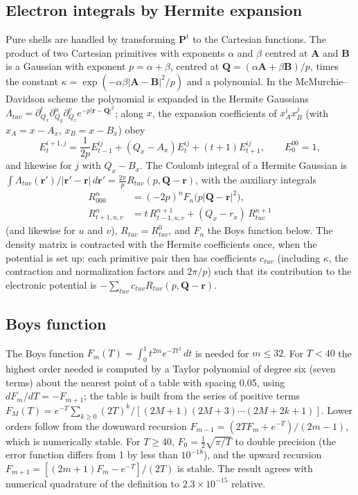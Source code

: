 \documentclass[11pt,a4paper]{article}
\begin{document}
\subsection{Electron integrals by Hermite expansion}
Pure shells are handled by transforming $\mathbf P^{\mathrm t}$ to the
Cartesian functions. The product of two Cartesian primitives with exponents
$\alpha$ and $\beta$ centred at $\mathbf A$ and $\mathbf B$ is a Gaussian
with exponent $p=\alpha+\beta$, centred at
$\mathbf Q=(\alpha\mathbf A+\beta\mathbf B)/p$, times the constant
$\kappa=\exp(-\alpha\beta|\mathbf A-\mathbf B|^2/p)$ and a polynomial. In
the McMurchie--Davidson scheme the polynomial is expanded in the Hermite
Gaussians
$\Lambda_{tuv}=\partial^t_{Q_x}\partial^u_{Q_y}\partial^v_{Q_z}e^{-p|\mathbf r-\mathbf Q|^2}$;
along $x$, the expansion coefficients of $x_A^ix_B^j$ (with
$x_A=x-A_x$, $x_B=x-B_x$) obey
\begin{equation}
 E^{i+1,j}_t=\frac{1}{2p}E^{ij}_{t-1}+(Q_x-A_x)E^{ij}_t+(t+1)E^{ij}_{t+1},
 \qquad E^{00}_0=1,
\end{equation}
and likewise for $j$ with $Q_x-B_x$. The Coulomb integral of a Hermite
Gaussian is
$\int\Lambda_{tuv}(\mathbf r')/|\mathbf r'-\mathbf r|\,d\mathbf r'
=\frac{2\pi}{p}R_{tuv}(p,\mathbf Q-\mathbf r)$, with the auxiliary
integrals
\begin{align}
 R^n_{000}&=(-2p)^nF_n\big(p|\mathbf Q-\mathbf r|^2\big),\\
 R^n_{t+1,u,v}&=t\,R^{n+1}_{t-1,u,v}+(Q_x-r_x)\,R^{n+1}_{tuv}
\end{align}
(and likewise for $u$ and $v$), $R_{tuv}=R^0_{tuv}$, and $F_n$ the Boys
function below. The density matrix is contracted with the Hermite
coefficients once, when the potential is set up: each primitive pair then
has coefficients $c_{tuv}$ (including $\kappa$, the contraction and
normalization factors and $2\pi/p$) such that its contribution to the
electronic potential is $-\sum_{tuv}c_{tuv}R_{tuv}(p,\mathbf Q-\mathbf r)$.

\subsection{Boys function}
The Boys function $F_m(T)=\int_0^1t^{2m}e^{-Tt^2}\,dt$ is needed for
$m\le32$. For $T<40$ the highest order needed is computed by a Taylor
polynomial of degree six (seven terms) about the nearest point of a table with
spacing 0.05, using $dF_m/dT=-F_{m+1}$; the table is built from the series
of positive terms
$F_M(T)=e^{-T}\sum_{k\ge0}(2T)^k/[(2M+1)(2M+3)\cdots(2M+2k+1)]$. Lower
orders follow from the downward recursion
$F_{m-1}=(2TF_m+e^{-T})/(2m-1)$, which is numerically stable. For
$T\ge40$, $F_0=\frac12\sqrt{\pi/T}$ to double precision (the error function
differs from 1 by less than $10^{-18}$), and the upward recursion
$F_{m+1}=[(2m+1)F_m-e^{-T}]/(2T)$ is stable. The result agrees with
numerical quadrature of the definition to $2.3\times10^{-15}$ relative.
\end{document}
